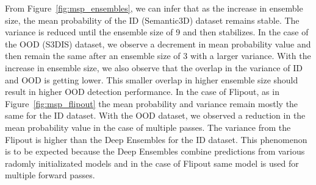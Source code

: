     From Figure~\ref{fig:msp_ensembles}, we can infer that as the increase in ensemble size, the mean probability of the ID (Semantic3D) dataset remains stable.
    The variance is reduced until the ensemble size of 9 and then stabilizes.
    In the case of the OOD (S3DIS) dataset, we observe a decrement in mean probability value and then remain the same after an ensemble size of 3 with a larger variance.
    With the increase in ensemble size, we also observe that the overlap in the variance of ID and OOD is getting lower.
    This smaller overlap in higher ensemble size should result in higher OOD detection performance.
    In the case of Flipout, as in Figure~\ref{fig:msp_flipout} the mean probability and variance remain mostly the same for the ID dataset.
    With the OOD dataset, we observed a reduction in the mean probability value in the case of multiple passes.
    The variance from the Flipout is higher than the Deep Ensembles for the ID dataset.
    This phenomenon is to be expected because the Deep Ensembles combine predictions from various radomly initializated models and in the case of Flipout same model is used for multiple forward passes.

